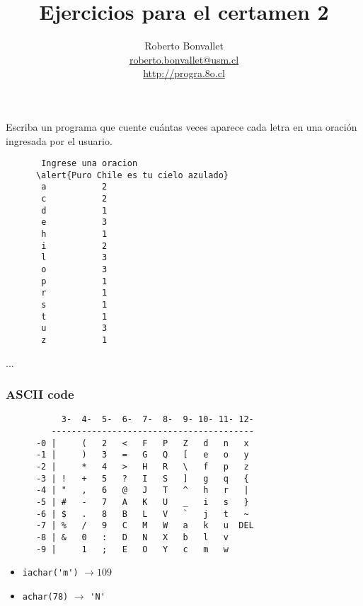 \documentclass[10pt]{beamer}
\title{Ejercicios para el certamen 2}
\author{
  Roberto Bonvallet \\
  \url{roberto.bonvallet@usm.cl} \\
  \url{http://progra.8o.cl}
}
\begin{document}
  \begin{frame}
    \maketitle
  \end{frame}

  \begin{frame}[fragile]
    Escriba un programa
    que cuente cuántas veces aparece cada letra
    en una oración ingresada por el usuario.
    \begin{Verbatim}
       Ingrese una oracion
      \alert{Puro Chile es tu cielo azulado}
       a           2
       c           2
       d           1
       e           3
       h           1
       i           2
       l           3
       o           3
       p           1
       r           1
       s           1
       t           1
       u           3
       z           1
    \end{Verbatim}

\end{frame}

  \begin{frame}
    
    ...
  \end{frame}

  \begin{frame}[fragile]
    \frametitle{ASCII code}
    \begin{verbatim}
           3-  4-  5-  6-  7-  8-  9- 10- 11- 12-
         ----------------------------------------
      -0 |     (   2   <   F   P   Z   d   n   x
      -1 |     )   3   =   G   Q   [   e   o   y
      -2 |     *   4   >   H   R   \   f   p   z
      -3 | !   +   5   ?   I   S   ]   g   q   {
      -4 | "   ,   6   @   J   T   ^   h   r   |
      -5 | #   -   7   A   K   U   _   i   s   }
      -6 | $   .   8   B   L   V   `   j   t   ~
      -7 | %   /   9   C   M   W   a   k   u  DEL
      -8 | &   0   :   D   N   X   b   l   v
      -9 |     1   ;   E   O   Y   c   m   w
    \end{verbatim}

    \begin{itemize}
      \item \lstinline+iachar('m')+ $\longrightarrow 109$
      \item \lstinline+achar(78)+ $\longrightarrow$ \lstinline+'N'+
    \end{itemize}

\end{frame}
\end{document}
